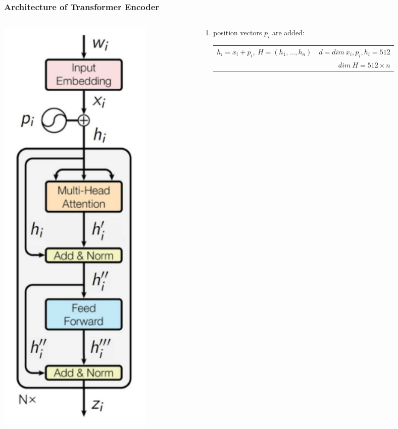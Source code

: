 \documentclass[fullscreen=true, bookmarks=true, hyperref={pdfencoding=unicode}]{beamer}
\begin{document}
\begin{frame}
  \frametitle{Architecture of Transformer Encoder}

    \begin{columns}
      \begin{column}{.2\paperwidth}
        \includegraphics[keepaspectratio,
                         width=.2\paperwidth]{transformer_encoder.png}
      \end{column}
      \begin{column}{.78\paperwidth}
        \begin{enumerate}
          \item position vectors $p_i$ are added: 

          \begin{tabular}{lr}
            \multirow{2}{*}{$h_i = x_i + p_i, \ H = (h_1, \dots, h_n)$} & ${\scriptscriptstyle d = dim\ x_i, p_i, h_i = 512}$ \\
                   & ${\scriptscriptstyle dim\ H = 512 \times n }$
          \end{tabular}


\end{enumerate}
\end{column}
\end{columns}
\end{frame}
\end{document}
